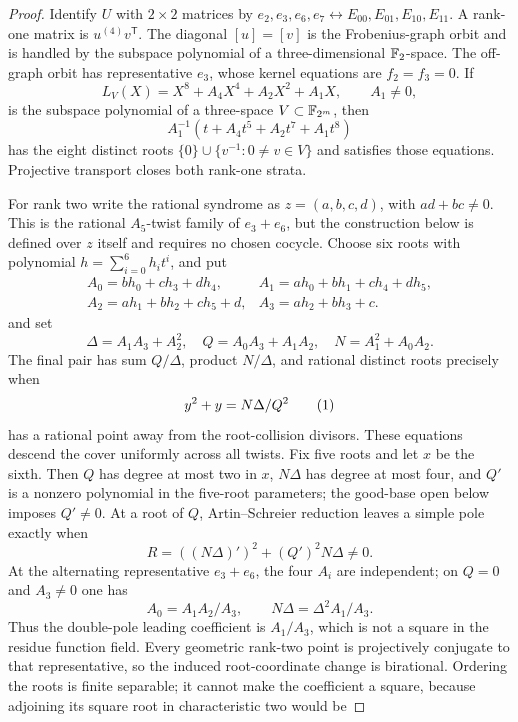 \begin{proof}
Identify \(U\) with \(2\times2\) matrices by
\(e_2,e_3,e_6,e_7\leftrightarrow E_{00},E_{01},E_{10},E_{11}\).
A rank-one matrix is \(u^{(4)}v^{\mathsf T}\).  The diagonal
\([u]=[v]\) is the Frobenius-graph orbit and is handled by the subspace
polynomial of a three-dimensional \(\mathbb F_2\)-space.  The off-graph orbit has
representative \(e_3\), whose kernel equations are \(f_2=f_3=0\).  If
\[
 L_V(X)=X^8+A_4X^4+A_2X^2+A_1X,\qquad A_1\ne0,
\]
is the subspace polynomial of a three-space \(V\subset\mathbb F_{2^m}\), then
\[
 A_1^{-1}(t+A_4t^5+A_2t^7+A_1t^8)
\]
has the eight distinct roots
\(\{0\}\cup\{v^{-1}:0\ne v\in V\}\) and satisfies those equations.
Projective transport closes both rank-one strata.

For rank two write the rational syndrome as
\(z=(a,b,c,d)\), with \(ad+bc\ne0\).  This is the rational
\(A_5\)-twist family of \(e_3+e_6\), but the construction below is defined
over \(z\) itself and requires no chosen cocycle.  Choose six roots with
polynomial $h=\sum_{i=0}^6h_it^i$, and put
\[
\begin{array}{ll}
A_0=bh_0+ch_3+dh_4,&A_1=ah_0+bh_1+ch_4+dh_5,\\
A_2=ah_1+bh_2+ch_5+d,&A_3=ah_2+bh_3+c.
\end{array}
\]
and set
\[
 \Delta=A_1A_3+A_2^2,\quad Q=A_0A_3+A_1A_2,\quad
 N=A_1^2+A_0A_2.
\]
The final pair has sum $Q/\Delta$, product $N/\Delta$, and rational
distinct roots precisely when
\[
                         y^2+y=N\Delta/Q^2
 \autoeqtag{eq:artin-schreier-cover}
\]
has a rational point away from the root-collision divisors.  These equations
descend the cover uniformly across all twists.  Fix five roots and let \(x\)
be the sixth.  Then \(Q\) has degree at most two in \(x\), \(N\Delta\) has
degree at most four, and \(Q'\) is a nonzero polynomial in the five-root
parameters; the good-base open below imposes \(Q'\ne0\).  At a root of \(Q\),
Artin--Schreier reduction leaves a simple pole exactly when
\[
 R=((N\Delta)')^2+(Q')^2N\Delta\ne0.
\]
At the alternating representative \(e_3+e_6\), the four \(A_i\) are
independent; on \(Q=0\) and \(A_3\ne0\) one has
\[
 A_0=A_1A_2/A_3,\qquad N\Delta=\Delta^2A_1/A_3.
\]
Thus the double-pole leading coefficient is \(A_1/A_3\), which is not a
square in the residue function field.  Every geometric rank-two point is
projectively conjugate to that representative, so the induced root-coordinate
change is birational.
Ordering the roots is finite separable; it cannot make the coefficient a
square, because adjoining its square root in characteristic two would be

\end{proof}
